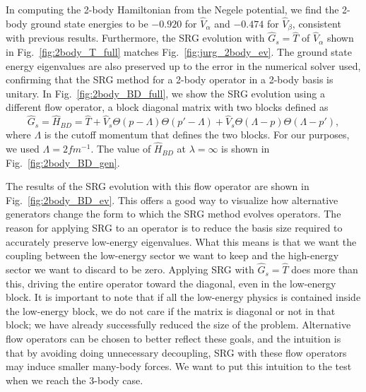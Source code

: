 In computing the 2-body Hamiltonian from the Negele potential, we find the 2-body ground state energies to be $-0.920$ for $\hat{V}_\alpha$ and $-0.474$ for $\hat{V}_\beta$, consistent with previous results. Furthermore, the SRG evolution with $\hat{G}_s=\hat{T}$ of $\hat{V}_\alpha$ shown in Fig.~\ref{fig:2body_T_full} matches Fig.~\ref{fig:jurg_2body_ev}. The ground state energy eigenvalues are also preserved up to the error in the numerical solver used, confirming that the SRG method for a 2-body operator in a 2-body basis is unitary. In Fig.~\ref{fig:2body_BD_full}, we show the SRG evolution using a different flow operator, a block diagonal matrix with two blocks defined as
\begin{equation}\label{eq:H_bd_p}
\hat{G}_s = \hat{H}_{BD} = \hat{T} + \hat{V}_s \Theta(p - \Lambda) \Theta(p' - \Lambda) + \hat{V}_s \Theta(\Lambda - p) \Theta(\Lambda - p'),
\end{equation}
where $\Lambda$ is the cutoff momentum that defines the two blocks. For our purposes, we used $\Lambda=2 fm^{-1}$. The value of $\hat{H}_{BD}$ at $\lambda=\infty$ is shown in Fig.~\ref{fig:2body_BD_gen}.

The results of the SRG evolution with this flow operator are shown in Fig.~\ref{fig:2body_BD_ev}. This offers a good way to visualize how alternative generators change the form to which the SRG method evolves operators. The reason for applying SRG to an operator is to reduce the basis size required to accurately preserve low-energy eigenvalues. What this means is that we want the coupling between the low-energy sector we want to keep and the high-energy sector we want to discard to be zero. Applying SRG with $\hat{G}_s=\hat{T}$ does more than this, driving the entire operator toward the diagonal, even in the low-energy block. It is important to note that if all the low-energy physics is contained inside the low-energy block, we do not care if the matrix is diagonal or not in that block; we have already successfully reduced the size of the problem. Alternative flow operators can be chosen to better reflect these goals, and the intuition is that by avoiding doing unnecessary decoupling, SRG with these flow operators may induce smaller many-body forces. We want to put this intuition to the test when we reach the 3-body case.


